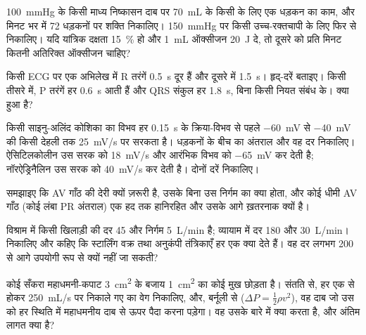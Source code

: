 \begin{exercise}[$\star\star$]\label{exo:b2:heart:6}
\qty{100}{mmHg} के किसी माध्य निष्कासन दाब पर \qty{70}{mL} के किसी
 के लिए एक धड़कन का काम, और मिनट भर में 72 धड़कनों पर
शक्ति निकालिए। \qty{150}{mmHg} पर किसी उच्च-रक्तचापी के लिए फिर से निकालिए।
यदि यांत्रिक दक्षता \qty{15}{\%} हो और \qty{1}{mL} ऑक्सीजन
\qty{20}{J} दे, तो दूसरे  को प्रति मिनट कितनी अतिरिक्त
ऑक्सीजन चाहिए?
\end{exercise}

\begin{exercise}[$\star\star$]\label{exo:b2:heart:7}
किसी ECG पर एक अभिलेख में R तरंगें \qty{0.5}{s} दूर हैं और
दूसरे में \qty{1.5}{s}। हृद्-दरें बताइए। किसी तीसरे में, P तरंगें
हर \qty{0.6}{s} आती हैं और QRS संकुल हर \qty{1.8}{s}, बिना किसी
नियत संबंध के। क्या हुआ है?
\end{exercise}

\begin{exercise}[$\star\star$]\label{exo:b2:heart:8}
किसी साइनु-अलिंद कोशिका का विभव हर \qty{0.15}{s} के क्रिया-विभव से पहले
\qty{-60}{mV} से \qty{-40}{mV} की किसी देहली तक \qty{25}{mV/s} पर
सरकता है। धड़कनों के बीच का अंतराल और
वह दर निकालिए। ऐसिटिलकोलीन उस सरक को \qty{18}{mV/s} और
आरंभिक विभव को \qty{-65}{mV} कर देती है; नॉरऐड्रिनैलिन उस सरक को
\qty{40}{mV/s} कर देती है। दोनों दरें निकालिए।
\end{exercise}

\begin{exercise}[$\star\star$]\label{exo:b2:heart:9}
समझाइए कि AV गाँठ की देरी क्यों ज़रूरी है, उसके बिना उस
निर्गम का क्या होता, और कोई धीमी AV गाँठ (कोई लंबा PR अंतराल)
एक हद तक हानिरहित और उसके आगे ख़तरनाक क्यों है।
\end{exercise}

\begin{exercise}[$\star\star\star$]\label{exo:b2:heart:10}
विश्राम में किसी खिलाड़ी की दर 45 और निर्गम \qty{5}{L/min} है;
व्यायाम में दर 180 और \qty{30}{L/min}। 
निकालिए और कहिए कि स्टार्लिंग वक्र तथा अनुकंपी तंत्रिकाएँ
हर एक क्या देते हैं। वह दर लगभग 200 से आगे उपयोगी रूप से क्यों नहीं जा सकती?
\end{exercise}

\begin{exercise}[$\star\star\star$]\label{exo:b2:heart:11}
कोई सँकरा महाधमनी-कपाट \qty{3}{cm^2} के बजाय \qty{1}{cm^2} का
कोई मुख छोड़ता है। संतति से, हर एक से होकर \qty{250}{mL/s} पर
निकाले गए  का वेग निकालिए, और, बर्नूली से
($\Delta P = \tfrac12\rho v^2$), वह दाब जो उस  को हर स्थिति में
महाधमनीय दाब से ऊपर पैदा करना पड़ेगा। वह
 उसके बारे में क्या करता है, और अंतिम लागत क्या है?
\end{exercise}

